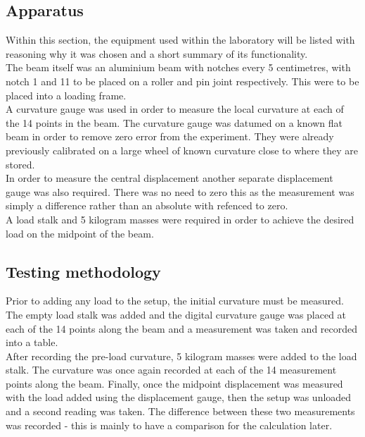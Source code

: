 \documentclass[12pt]{article}
\begin{document}
        \subsection{Apparatus}
            Within this section, the equipment used within the laboratory will be listed with reasoning why it was chosen and a short summary of its functionality. \\
            The beam itself was an aluminium beam with notches every 5 centimetres, with notch 1 and 11 to be placed on a roller and pin joint respectively. This were to be
            placed into a loading frame. \\
            A curvature gauge was used in order to measure the local curvature at each of the 14 points in the beam. The curvature gauge was datumed on a known flat beam
            in order to remove zero error from the experiment. They were already previously calibrated on a large wheel of known curvature close to where they are stored.\\
            In order to measure the central displacement another separate displacement gauge was also required. There was no need to zero this as the measurement
            was simply a difference rather than an absolute with refenced to zero. \\
            A load stalk and 5 kilogram masses were required in order to achieve the desired load on the midpoint of the beam.
        \subsection{Testing methodology}
            Prior to adding any load to the setup, the initial curvature must be measured. The empty load stalk was added and the digital curvature gauge was 
            placed at each of the 14 points along the beam and a measurement was taken and recorded into a table. \\ After recording the pre-load curvature, 5 kilogram masses
            were added to the load stalk. The curvature was once again recorded at each of the 14 measurement points along the beam. Finally, once the midpoint displacement
            was measured with the load added using the displacement gauge, then the setup was unloaded and a second reading was taken. The difference between these
            two measurements was recorded - this is mainly to have a comparison for the calculation later.
\end{document}
